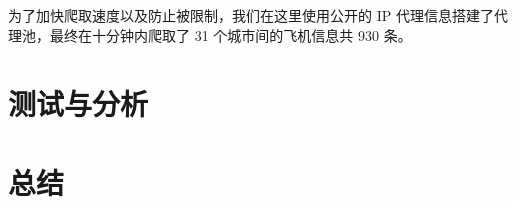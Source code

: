 \documentclass[lang=cn,blue]{elegantbook}
\begin{document}
为了加快爬取速度以及防止被限制，我们在这里使用公开的 IP 代理信息搭建了代理池，最终在十分钟内爬取了 31 个城市间的飞机信息共 930 条。

\chapter{测试与分析}

\chapter{总结}
\end{document}
